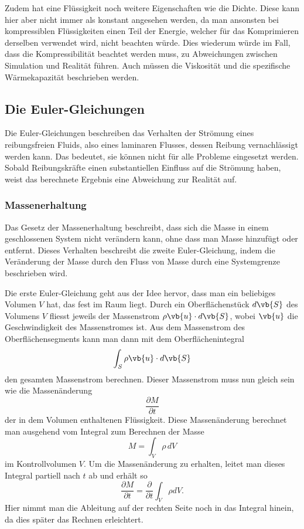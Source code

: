 Zudem hat eine Flüssigkeit noch weitere Eigenschaften wie die Dichte. 
Diese kann hier aber nicht immer als konstant angesehen werden, da man ansonsten bei kompressiblen Flüssigkeiten einen Teil der Energie, welcher für das Komprimieren derselben verwendet wird, nicht beachten würde.
Dies wiederum würde im Fall, dass die Kompressibilität beachtet werden muss, zu Abweichungen zwischen Simulation und Realität führen.
Auch müssen die Viskosität und die spezifische Wärmekapazität beschrieben werden.

\subsection{Die Euler-Gleichungen}
Die Euler-Gleichungen beschreiben das Verhalten der Strömung eines reibungsfreien Fluids, also eines laminaren Flusses, dessen Reibung vernachlässigt werden kann. 
Das bedeutet, sie können nicht für alle Probleme eingesetzt werden. 
Sobald Reibungskräfte einen substantiellen Einfluss auf die Strömung haben, weist das berechnete Ergebnis eine Abweichung zur Realität auf.

\subsubsection{Massenerhaltung}
Das Gesetz der Massenerhaltung beschreibt, dass sich die Masse in einem geschlossenen System nicht verändern kann, ohne dass man Masse hinzufügt oder entfernt. 
Dieses Verhalten beschreibt die zweite Euler-Gleichung, indem die Veränderung der Masse durch den Fluss von Masse durch eine Systemgrenze beschrieben wird.

Die erste Euler-Gleichung geht aus der Idee hervor, dass man ein beliebiges Volumen $V$ hat, das fest im Raum liegt. Durch ein Oberflächenstück 
$d \vb{S} $ 
des Volumens 
$V$
 fliesst jeweils der Massenstrom 
$ \rho\vb{u}\cdot d\vb{S}$, wobei $\vb{u}$ die Geschwindigkeit des Massenstromes ist.
Aus dem Massenstrom des Oberflächensegments kann man dann mit dem Oberflächenintegral 
\[\int_{S}\rho\vb{u}\cdot d\vb{S}\]
den gesamten Massenstrom berechnen. Dieser Massenstrom muss nun gleich sein wie die Massenänderung 
\[\frac{\partial M}{\partial t}\]
der in dem Volumen enthaltenen Flüssigkeit.
Diese Massenänderung berechnet man ausgehend vom Integral zum Berechnen der Masse 
\[M 
= 
\int_{V} \rho \, dV\]
im Kontrollvolumen $V.$
Um die Massenänderung zu erhalten, leitet man dieses Integral partiell nach $t$ ab und erhält so
\[\frac{\partial M}{\partial t}
=
\frac{\partial }{\partial t} \int_{V}\rho dV.\]
Hier nimmt man die Ableitung auf der rechten Seite noch in das Integral hinein, da dies später das Rechnen erleichtert.


